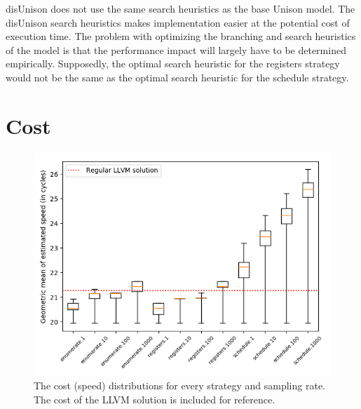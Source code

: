 disUnison does not use the same search heuristics as the base Unison model. The disUnison
search heuristics makes implementation easier at the potential cost of execution time. The
problem with optimizing the branching and search heuristics of the model is that the
performance impact will largely have to be determined empirically. Supposedly, the optimal
search heuristic for the registers strategy would not be the same as the optimal search
heuristic for the schedule strategy.

\section{Cost}


\begin{figure}[h]
	\centering
	\includegraphics[width=\textwidth,height=0.5\textheight]{results/figures/cost_speed}
	\caption{The cost (speed) distributions for every strategy and sampling rate. The cost of the LLVM solution is included for reference.}
	\label{fig:cost-speed}
\end{figure}

